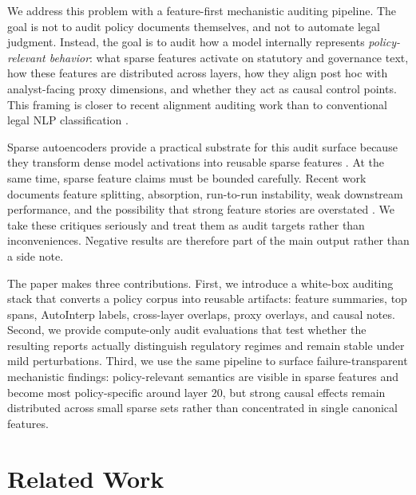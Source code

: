 \documentclass{article}
\begin{document}
We address this problem with a feature-first mechanistic auditing pipeline. The goal is not to audit policy documents themselves, and not to automate legal judgment. Instead, the goal is to audit how a model internally represents \emph{policy-relevant behavior}: what sparse features activate on statutory and governance text, how these features are distributed across layers, how they align post hoc with analyst-facing proxy dimensions, and whether they act as causal control points. This framing is closer to recent alignment auditing work than to conventional legal NLP classification \cite{sheshadri2026auditbench, bricken2025auditingagents, marks2025hiddenobjectives, fronsdal2025petri}.

Sparse autoencoders provide a practical substrate for this audit surface because they transform dense model activations into reusable sparse features \cite{bricken2023monosemanticity, templeton2024scaling, cunningham2024sae, lieberum2024gemmascope}. At the same time, sparse feature claims must be bounded carefully. Recent work documents feature splitting, absorption, run-to-run instability, weak downstream performance, and the possibility that strong feature stories are overstated \cite{karvonen2025saebench, chanin2024absorption, paulo2025differentfeatures, smith2024strongfeature, deepmindsafety2025negative, sharkey2025openproblems}. We take these critiques seriously and treat them as audit targets rather than inconveniences. Negative results are therefore part of the main output rather than a side note.

The paper makes three contributions. First, we introduce a white-box auditing stack that converts a policy corpus into reusable artifacts: feature summaries, top spans, AutoInterp labels, cross-layer overlaps, proxy overlays, and causal notes. Second, we provide compute-only audit evaluations that test whether the resulting reports actually distinguish regulatory regimes and remain stable under mild perturbations. Third, we use the same pipeline to surface failure-transparent mechanistic findings: policy-relevant semantics are visible in sparse features and become most policy-specific around layer 20, but strong causal effects remain distributed across small sparse sets rather than concentrated in single canonical features.

\section{Related Work}
\end{document}

